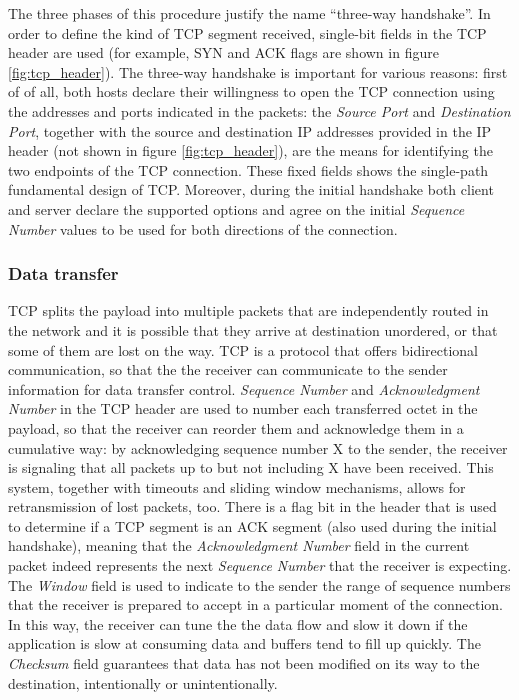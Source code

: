 The three phases of this procedure justify the name ``three-way handshake''. In order to define the kind of TCP segment received, single-bit fields in the TCP header are used (for example, SYN and ACK flags are shown in figure \ref{fig:tcp_header}). 
The three-way handshake is important for various reasons: first of of all, both hosts declare their willingness to open the TCP connection using the addresses and ports indicated in the packets: the \textit{Source Port} and \textit{Destination Port}, together with the source and destination IP addresses provided in the IP header (not shown in figure \ref{fig:tcp_header}), are the means for identifying the two endpoints of the TCP connection. These fixed fields shows the single-path fundamental design of TCP. 
Moreover, during the initial handshake both client and server declare the supported options and agree on the initial \textit{Sequence Number} values to be used for both directions of the connection.

\subsubsection{Data transfer}
TCP splits the payload into multiple packets that are independently routed in the network and it is possible that they arrive at destination unordered, or that some of them are lost on the way. TCP is a protocol that offers bidirectional communication, so that the the receiver can communicate to the sender information for data transfer control. \textit{Sequence Number} and \textit{Acknowledgment Number} in the TCP header are used to number each transferred octet in the payload, so that the receiver can reorder them and acknowledge them in a cumulative way: by acknowledging sequence number X to the sender, the receiver is signaling that all packets up to but not including X have been received. This system, together with timeouts and sliding window mechanisms, allows for retransmission of lost packets, too. There is a flag bit in the header that is used to determine if a TCP segment is an ACK segment (also used during the initial handshake), meaning that the \textit{Acknowledgment Number} field in the current packet indeed represents the next \textit{Sequence Number} that the receiver is expecting. 
The \textit{Window} field is used to indicate to the sender the range of sequence numbers that the receiver is prepared to accept in a particular moment of the connection. In this way, the receiver can tune the the data flow and slow it down if the application is slow at consuming data and buffers tend to fill up quickly. The \textit{Checksum} field guarantees that data has not been modified on its way to the destination, intentionally or unintentionally.

